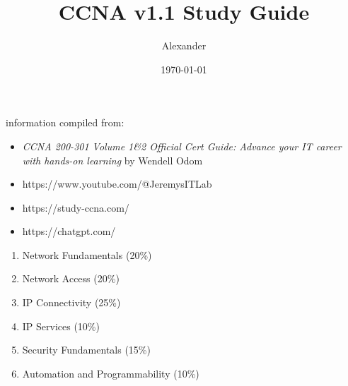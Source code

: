 \documentclass{article}
\title{CCNA v1.1 Study Guide}
\author{Alexander}
\date{\today}
\begin{document}
\maketitle

information compiled from:
\begin{itemize}
\item\textit{CCNA 200-301 Volume 1\&2 Official Cert Guide: Advance your IT career with hands-on learning} by Wendell Odom
\item https://www.youtube.com/@JeremysITLab
\item https://study-ccna.com/
\item https://chatgpt.com/\\
\end{itemize}

\begin{enumerate}
  \item Network Fundamentals (20\%)
  \item Network Access (20\%)
  \item IP Connectivity (25\%)
  \item IP Services (10\%)
  \item Security Fundamentals (15\%)
  \item Automation and Programmability (10\%)\\
\end{enumerate}
\end{document}
